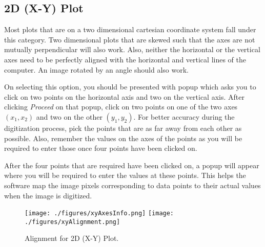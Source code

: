 \documentclass[letterpaper, 10pt]{article}
\begin{document}
\subsection{2D (X-Y) Plot}
Most plots that are on a two dimensional cartesian coordinate system fall under this category. Two dimensional plots that are skewed such that the axes are not mutually perpendicular will also work. Also, neither the horizontal or the vertical axes need to be perfectly aligned with the horizontal and vertical lines of the computer. An image rotated by an angle should also work. 

On selecting this option, you should be presented with popup which asks you to click on two points on the horizontal axis and two on the vertical axis. After clicking \emph{Proceed} on that popup, click on two points on one of the two axes $(x_1, x_2)$ and two on the other $(y_1, y_2)$. For better accuracy during the digitization process, pick the points that are as far away from each other as possible. Also, remember the values on the axes of the points as you will be required to enter those once four points have been clicked on.

After the four points that are required have been clicked on, a popup will appear where you will be required to enter the values at these points. This helps the software map the image pixels corresponding to data points to their actual values when the image is digitized.

\begin{figure}
\begin{center}
\texttt{[image: ./figures/xyAxesInfo.png]}
\texttt{[image: ./figures/xyAlignment.png]}
\caption{Alignment for 2D (X-Y) Plot.}
\label{fig:xyAlignment}
\end{center}
\end{figure}
\end{document}
